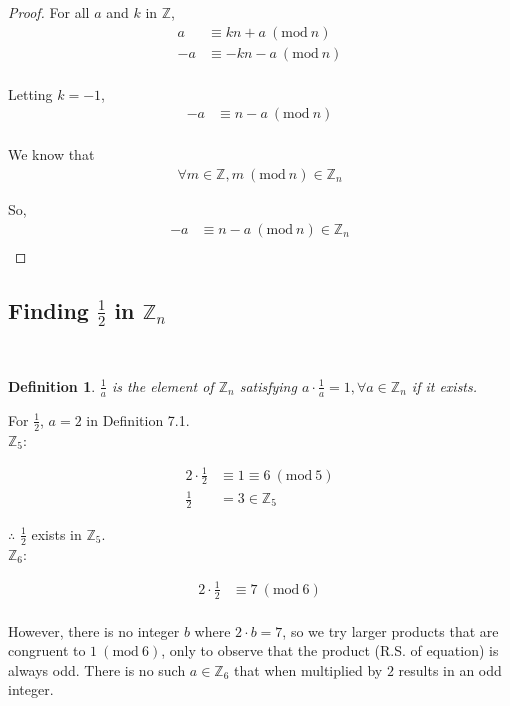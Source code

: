 \documentclass[12pt]{article}
\newcommand{\bZ}{{\mathbb{Z}}}
\newcommand{\Mod}[1]{\ (\mathrm{mod}\ #1)}
\newtheorem{definition}{Definition}[section]
\begin{document}
		\begin{proof}
			For all $a$ and $k$ in $\bZ$,
			\begin{align*}
				a &\equiv kn + a \Mod{n}\\
				-a &\equiv -kn - a \Mod{n}\\
			\end{align*}

			Letting $k = -1$,
			\begin{align*}
				-a &\equiv n - a \Mod{n}\\
			\end{align*}

			We know that
			\begin{align*}
				\forall m \in \bZ, m \Mod{n} \in \bZ_n
			\end{align*}

			So,
			\begin{align*}
				-a &\equiv n - a \Mod{n} \in \bZ_n\\
			\end{align*}
		\end{proof}

	\subsection{Finding $\frac{1}{2}$ in $\bZ_n$} \

		\begin{definition}
			$\frac{1}{a}$ is the element of $\bZ_n$ satisfying $a \cdot \frac{1}{a} = 1, \forall a \in \bZ_n$ if it exists.
		\end{definition}

		For $\frac{1}{2}$, $a=2$ in Definition 7.1.\\

		$\bZ_5$:

		\begin{align*}
			2 \cdot \frac{1}{2} &\equiv 1 \equiv 6 \Mod{5}\\
			\frac{1}{2} &= 3 \in \bZ_5
		\end{align*}

		$\therefore$ $\frac{1}{2}$ exists in $\bZ_5$.\\
		
		$\bZ_6$:

		\begin{align*}
			2 \cdot \frac{1}{2} &\equiv 7 \Mod{6}\\
		\end{align*}

		However, there is no integer $b$ where $2 \cdot b = 7$, so we try larger products that are congruent to $1 \Mod{6}$, only to observe that the product (R.S. of equation) is always odd. There is no such $a \in \bZ_6$ that when multiplied by $2$ results in an odd integer.\\
\end{document}
